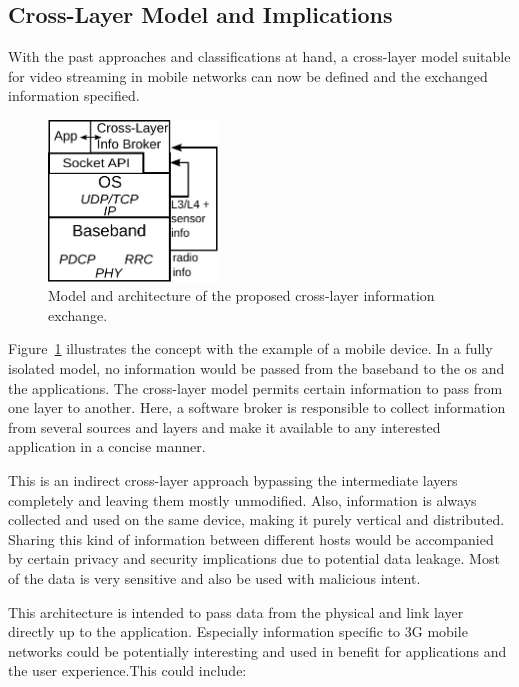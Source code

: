 \subsection{Cross-Layer Model and Implications}

With the past approaches and classifications at hand, a cross-layer model suitable for video streaming in mobile networks can now be defined and the exchanged information specified.

\begin{figure}[htb]
	\centering
	\includegraphics[width=0.4\textwidth]{images/cross-layer-model.pdf}
	\caption{Model and architecture of the proposed cross-layer information exchange.}
\label{c5:fig:crosslayer-model}
\end{figure}

Figure~\ref{c5:fig:crosslayer-model} illustrates the concept with the example of a mobile device. In a fully isolated model, no information would be passed from the baseband to the \gls{os} and the applications. The cross-layer model permits certain information to pass from one layer to another. Here, a software broker is responsible to collect information from several sources and layers and make it available to any interested application in a concise manner. 

This is an indirect cross-layer approach bypassing the intermediate layers completely and leaving them mostly unmodified. Also, information is always collected and used on the same device, making it purely vertical and distributed. Sharing this kind of information between different hosts would be accompanied by certain privacy and security implications due to potential data leakage. Most of the data is very sensitive and also be used with malicious intent.

This architecture is intended to pass data from the physical and link layer directly up to the application. Especially information specific to \gls{3G} mobile networks could be potentially interesting and used in benefit for applications and the user experience.This could include:

